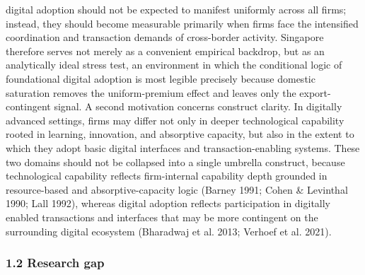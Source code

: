 \documentclass[12pt,a4paper]{article}
\begin{document}
digital adoption should not be expected to manifest uniformly across all
firms; instead, they should become measurable primarily when firms face
the intensified coordination and transaction demands of cross-border
activity. Singapore therefore serves not merely as a convenient
empirical backdrop, but as an analytically ideal stress test, an
environment in which the conditional logic of foundational digital
adoption is most legible precisely because domestic saturation removes
the uniform-premium effect and leaves only the export-contingent signal.
A second motivation concerns construct clarity. In digitally advanced
settings, firms may differ not only in deeper technological capability
rooted in learning, innovation, and absorptive capacity, but also in the
extent to which they adopt basic digital interfaces and
transaction-enabling systems. These two domains should not be collapsed
into a single umbrella construct, because technological capability
reflects firm-internal capability depth grounded in resource-based and
absorptive-capacity logic (Barney 1991; Cohen \& Levinthal 1990; Lall
1992), whereas digital adoption reflects participation in digitally
enabled transactions and interfaces that may be more contingent on the
surrounding digital ecosystem (Bharadwaj et al. 2013; Verhoef et al.
2021).

\hypertarget{12-research-gap}{%
\subsubsection{1.2 Research gap}\label{12-research-gap}}
\end{document}
